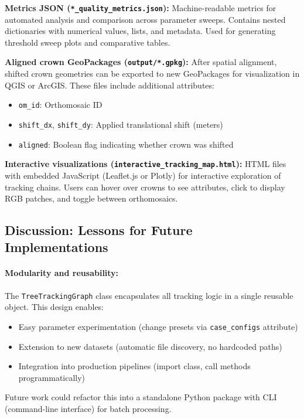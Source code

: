 \textbf{Metrics JSON (\texttt{*\_quality\_metrics.json}):}
Machine-readable metrics for automated analysis and comparison across parameter sweeps. Contains nested dictionaries with numerical values, lists, and metadata. Used for generating threshold sweep plots and comparative tables.

\textbf{Aligned crown GeoPackages (\texttt{output/*.gpkg}):}
After spatial alignment, shifted crown geometries can be exported to new GeoPackages for visualization in QGIS or ArcGIS. These files include additional attributes:
\begin{itemize}
    \item \texttt{om\_id}: Orthomosaic ID
    \item \texttt{shift\_dx}, \texttt{shift\_dy}: Applied translational shift (meters)
    \item \texttt{aligned}: Boolean flag indicating whether crown was shifted
\end{itemize}

\textbf{Interactive visualizations (\texttt{interactive\_tracking\_map.html}):}
HTML files with embedded JavaScript (Leaflet.js or Plotly) for interactive exploration of tracking chains. Users can hover over crowns to see attributes, click to display RGB patches, and toggle between orthomosaics.


\subsection{Discussion: Lessons for Future Implementations}

\paragraph{Modularity and reusability:}
The \texttt{TreeTrackingGraph} class encapsulates all tracking logic in a single reusable object. This design enables:
\begin{itemize}
    \item Easy parameter experimentation (change presets via \texttt{case\_configs} attribute)
    \item Extension to new datasets (automatic file discovery, no hardcoded paths)
    \item Integration into production pipelines (import class, call methods programmatically)
\end{itemize}
Future work could refactor this into a standalone Python package with CLI (command-line interface) for batch processing.